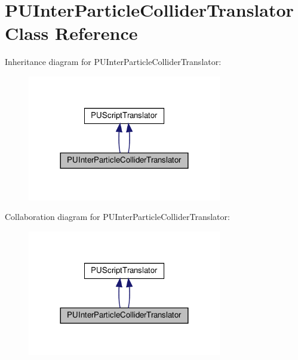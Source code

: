 \hypertarget{classPUInterParticleColliderTranslator}{}\section{P\+U\+Inter\+Particle\+Collider\+Translator Class Reference}
\label{classPUInterParticleColliderTranslator}


Inheritance diagram for P\+U\+Inter\+Particle\+Collider\+Translator\+:
\nopagebreak
\begin{figure}[H]
\begin{center}
\leavevmode
\includegraphics[width=240pt]{classPUInterParticleColliderTranslator__inherit__graph}
\end{center}
\end{figure}


Collaboration diagram for P\+U\+Inter\+Particle\+Collider\+Translator\+:
\nopagebreak
\begin{figure}[H]
\begin{center}
\leavevmode
\includegraphics[width=240pt]{classPUInterParticleColliderTranslator__coll__graph}
\end{center}
\end{figure}
